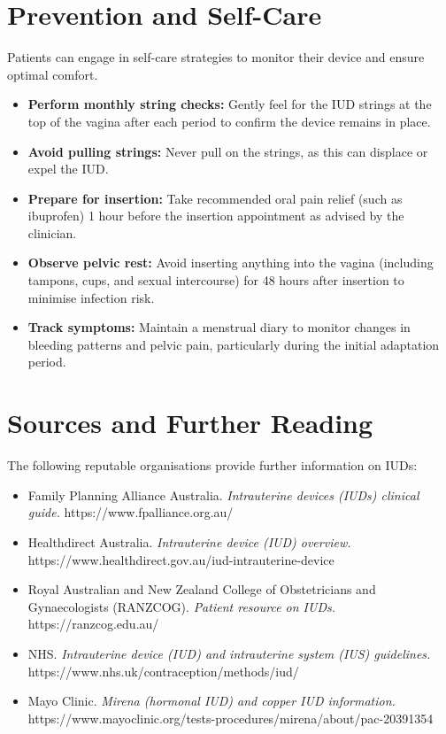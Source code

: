 \section*{Prevention and Self-Care}
Patients can engage in self-care strategies to monitor their device and ensure optimal comfort.
\begin{itemize}
    \item \textbf{Perform monthly string checks:} Gently feel for the IUD strings at the top of the vagina after each period to confirm the device remains in place.
    \item \textbf{Avoid pulling strings:} Never pull on the strings, as this can displace or expel the IUD.
    \item \textbf{Prepare for insertion:} Take recommended oral pain relief (such as ibuprofen) 1 hour before the insertion appointment as advised by the clinician.
    \item \textbf{Observe pelvic rest:} Avoid inserting anything into the vagina (including tampons, cups, and sexual intercourse) for 48 hours after insertion to minimise infection risk.
    \item \textbf{Track symptoms:} Maintain a menstrual diary to monitor changes in bleeding patterns and pelvic pain, particularly during the initial adaptation period.
\end{itemize}

\section*{Sources and Further Reading}
The following reputable organisations provide further information on IUDs:
\begin{itemize}
    \item Family Planning Alliance Australia. \textit{Intrauterine devices (IUDs) clinical guide.} https://www.fpalliance.org.au/
    \item Healthdirect Australia. \textit{Intrauterine device (IUD) overview.} https://www.healthdirect.gov.au/iud-intrauterine-device
    \item Royal Australian and New Zealand College of Obstetricians and Gynaecologists (RANZCOG). \textit{Patient resource on IUDs.} https://ranzcog.edu.au/
    \item NHS. \textit{Intrauterine device (IUD) and intrauterine system (IUS) guidelines.} https://www.nhs.uk/contraception/methods/iud/
    \item Mayo Clinic. \textit{Mirena (hormonal IUD) and copper IUD information.} https://www.mayoclinic.org/tests-procedures/mirena/about/pac-20391354
\end{itemize}
